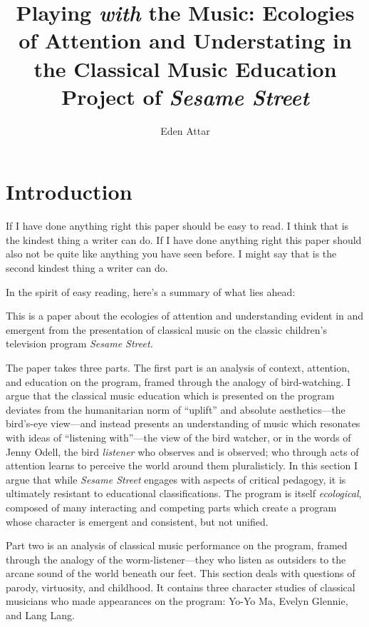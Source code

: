 \documentclass[12pt,letterpaper]{article}
\begin{document}
	
	\title{Playing \textit{with} the Music: Ecologies of Attention and Understating 
	in the Classical Music Education Project of \textit{Sesame Street}}
	\author{Eden Attar}
	\maketitle
	\doublespacing
	\thispagestyle{empty}
	\newpage
	\clearpage
	\setcounter{page}{1}
	\thispagestyle{empty}
	\frenchspacing
	
	\section*{Introduction}	

	If I have done anything right this paper should be easy to read. I
	think that is the kindest thing a writer can do. If I have
	done anything right this paper should also not be quite like anything 
	you have seen before. I might say that is the second kindest thing a 
	writer can do.  

	In the spirit of easy reading, here's a summary of what lies ahead:

	This is a paper about the ecologies of attention and understanding 
	evident in and emergent from the presentation of classical music on the
	classic children's television program \textit{Sesame Street.}  
	
	The paper takes three parts. The first part is an analysis of context,
	attention, and education on the program, framed through the analogy of
	bird-watching. I argue that the classical music education which is 
	presented on the program deviates from the humanitarian norm of 
	``uplift'' and absolute aesthetics---the bird's-eye view---and instead
	presents an understanding of music which resonates with ideas of 
	``listening with''---the view of the bird watcher, or in the words of
	Jenny Odell, the bird \textit{listener} who observes and is observed;
	who through acts of attention learns to perceive the world around them
	pluralisticly. In this section I argue that while \textit{Sesame
	Street} engages with aspects of critical pedagogy, it is ultimately 
	resistant to educational classifications. The program is itself
	\textit{ecological}, composed of many interacting and competing parts
	which create a program whose character is emergent and consistent, but
	not unified.   

	Part two is an analysis of classical music performance on the program, 
	framed through the analogy of the worm-listener---they who listen as 
	outsiders to 
	the arcane sound of the world beneath our feet. This section deals with
	questions of parody, virtuosity, and childhood. It contains three
	character studies of classical musicians who made appearances on the
	program: Yo-Yo Ma, Evelyn Glennie, and Lang Lang.   
\end{document}
